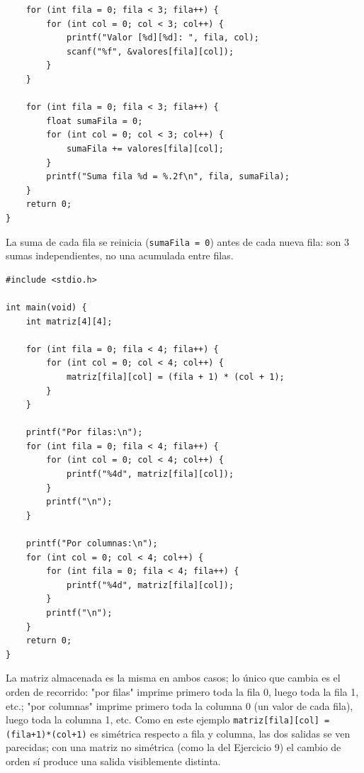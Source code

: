 \documentclass[11pt,letterpaper]{article}
\theoremstyle{definition}
\begin{document}
\begin{description}
\begin{lstlisting}
    for (int fila = 0; fila < 3; fila++) {
        for (int col = 0; col < 3; col++) {
            printf("Valor [%d][%d]: ", fila, col);
            scanf("%f", &valores[fila][col]);
        }
    }

    for (int fila = 0; fila < 3; fila++) {
        float sumaFila = 0;
        for (int col = 0; col < 3; col++) {
            sumaFila += valores[fila][col];
        }
        printf("Suma fila %d = %.2f\n", fila, sumaFila);
    }
    return 0;
}
\end{lstlisting}
La suma de cada fila se reinicia (\texttt{sumaFila = 0}) antes de cada nueva fila: son 3 sumas
independientes, no una acumulada entre filas.

\item[\textbf{Ejercicio 12.}]
\begin{lstlisting}
#include <stdio.h>

int main(void) {
    int matriz[4][4];

    for (int fila = 0; fila < 4; fila++) {
        for (int col = 0; col < 4; col++) {
            matriz[fila][col] = (fila + 1) * (col + 1);
        }
    }

    printf("Por filas:\n");
    for (int fila = 0; fila < 4; fila++) {
        for (int col = 0; col < 4; col++) {
            printf("%4d", matriz[fila][col]);
        }
        printf("\n");
    }

    printf("Por columnas:\n");
    for (int col = 0; col < 4; col++) {
        for (int fila = 0; fila < 4; fila++) {
            printf("%4d", matriz[fila][col]);
        }
        printf("\n");
    }
    return 0;
}
\end{lstlisting}
La matriz almacenada es la misma en ambos casos; lo único que cambia es el orden de recorrido:
"por filas" imprime primero toda la fila 0, luego toda la fila 1, etc.; "por columnas" imprime
primero toda la columna 0 (un valor de cada fila), luego toda la columna 1, etc. Como en este
ejemplo \texttt{matriz[fila][col] = (fila+1)*(col+1)} es simétrica respecto a fila y columna, las
dos salidas se ven parecidas; con una matriz no simétrica (como la del Ejercicio 9) el cambio de
orden sí produce una salida visiblemente distinta.

\end{description}
\end{document}
